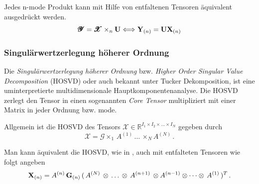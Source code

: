 \begin{Bemerkung}
Jedes n-mode Produkt kann mit Hilfe von entfaltenen Tensoren äquivalent ausgedrückt werden.
\begin{equation}
\pmb{\mathscr{Y}} = \pmb{\mathscr{X}} \times_n \bold{U} \Longleftrightarrow \bold{Y}_{(n)} = \bold{U} \bold{X}_{(n)}
\end{equation}
\end{Bemerkung}

\subsubsection{Singulärwertzerlegung höherer Ordnung}

Die \textit{Singulärwertzerlegung höherer Ordnung} bzw. \textit{Higher Order Singular Value Decomposition} (HOSVD) oder auch bekannt unter Tucker Dekomposition, ist eine uminterpretierte multidimensionale Hauptkomponentenanalyse.
Die HOSVD zerlegt den Tensor in einen sogenannten \textit{Core Tensor} multipliziert mit einer Matrix in jeder Ordnung bzw. mode. 

Allgemein ist die HOSVD des Tensors $\pmb{\mathscr{X}}  \in \mathbb{R}^{I_1 \times I_2 \times \dots \times I_N}$ gegeben durch
\begin{equation}
\pmb{\mathscr{X}}= \pmb{\mathscr{G}} \times_1 \, A^{(1)} \, \dots \, \times_N A^{(N)} \, .
\end{equation}

Man kann äquivalent die HOSVD, wie in  \cite[462]{Kolda}, auch mit entfalteten Tensoren wie folgt angeben
\begin{equation} \label{eq:tensortensor}
\bold{X}_{(n)} = A^{(n)} \, \bold{G}_{(n)} \, ( \, A^{(N)} \, \otimes  \, \dots \, \otimes \, A^{(n+1)} \, \otimes A^{(n-1)} \otimes \dots \otimes \, A^{(1)} \, )^{T} \, .
\end{equation}


